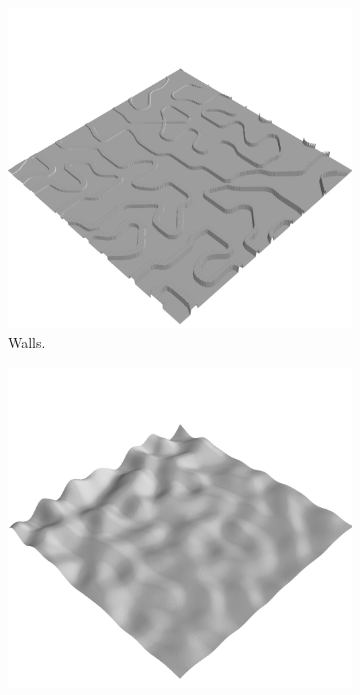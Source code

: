\documentclass[../document.tex]{subfiles}
\begin{document}
\begin{figure}[H]
    \centering
    \begin{subfigure}[b]{0.24\textwidth}
        \includegraphics[width=\linewidth]{../img/hm3d/bars1.png}
        \caption{Walls.}
    \end{subfigure}
    \begin{subfigure}[b]{0.24\textwidth}
        \includegraphics[width=\linewidth]{../img/hm3d/bumps2.png}

\end{subfigure}
\end{figure}
\end{document}

